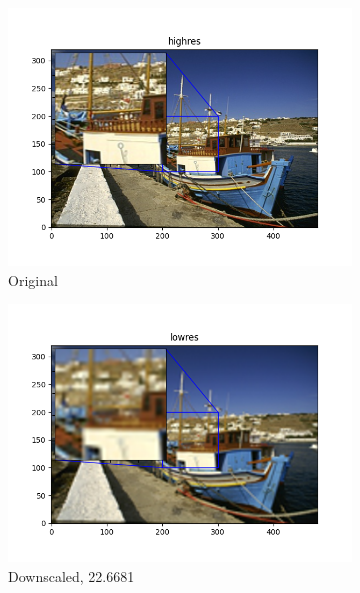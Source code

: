 \documentclass[12pt]{article}
\begin{document}
\begin{figure}[h!]
  \centering
  \begin{subfigure}[b]{0.32\linewidth}
    \includegraphics[width=\linewidth]{./5-highres.png}
    \caption{Original}
  \end{subfigure}
  \hfill
  \begin{subfigure}[b]{0.32\linewidth}
    \includegraphics[width=\linewidth]{./5-lowres.png}
    \caption{Downscaled, 22.6681}
  \end{subfigure}
  \hfill
  \begin{subfigure}[b]{0.32\linewidth}

\end{subfigure}
\end{figure}
\end{document}
